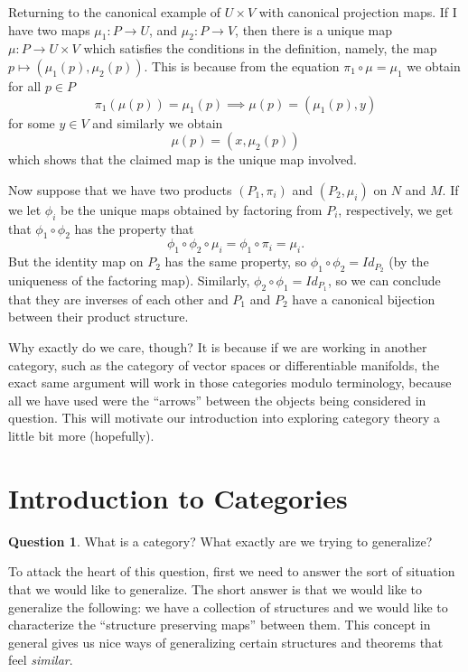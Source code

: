 \documentclass[12pt]{article}
\theoremstyle{plain}
\theoremstyle{definition}
\newtheorem{question}{Question}
\begin{document}
Returning to the canonical example of $U \times V$ with canonical projection maps. If I have two maps $\mu_1: P \to U$, and $\mu_2: P \to V$, then there is a unique map $\mu: P \to U \times V$ which satisfies the conditions in the definition, namely, the map $p \mapsto (\mu_1(p), \mu_2(p))$. This is because from the equation $\pi_1 \circ \mu = \mu_1$ we obtain for all $p \in P$
\[\pi_1(\mu(p)) = \mu_1(p) \implies \mu(p) = (\mu_1(p), y)\] for some $y \in V$ and similarly we obtain 
\[\mu(p) = (x, \mu_2(p))\] which shows that the claimed map is the unique map involved.

Now suppose that we have two products $(P_1, \pi_i)$ and $(P_2, \mu_i)$ on $N$ and $M$. If we let $\phi_i$ be the unique maps obtained by factoring from $P_i$, respectively, we get that $\phi_1 \circ \phi_2$ has the property that 
\[\phi_1 \circ \phi_2 \circ \mu_i = \phi_1 \circ \pi_i = \mu_i.\]
But the identity map on $P_2$ has the same property, so $\phi_1 \circ \phi_2 = Id_{P_2}$ (by the uniqueness of the factoring map). Similarly, $\phi_2 \circ \phi_1 = Id_{P_1}$, so we can conclude that they are inverses of each other and $P_1$ and $P_2$ have a canonical bijection between their product structure.

Why exactly do we care, though? It is because if we are working in another category, such as the category of vector spaces or differentiable manifolds, the exact same argument will work in those categories modulo terminology, because all we have used were the ``arrows'' between the objects being considered in question. This will motivate our introduction into exploring category theory a little bit more (hopefully).

\section{Introduction to Categories}

\begin{question}
What is a category? What exactly are we trying to generalize? 
\end{question}

To attack the heart of this question, first we need to answer the sort of situation that we would like to generalize. The short answer is that we would like to generalize the following: we have a collection of structures and we would like to characterize the ``structure preserving maps'' between them. This concept in general gives us nice ways of generalizing certain structures and theorems that feel \textit{similar}.
\end{document}
